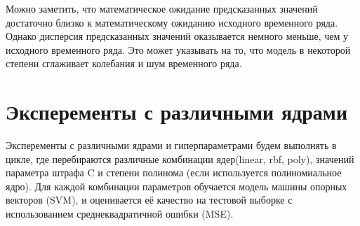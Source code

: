 \documentclass{article}
\begin{document}
Можно заметить, что математическое ожидание предсказанных значений достаточно близко к математическому ожиданию исходного временного ряда. Однако дисперсия предсказанных значений оказывается немного меньше, чем у исходного временного ряда. Это может указывать на то, что модель в некоторой степени сглаживает колебания и шум временного ряда.

\section{Эксперементы с различными ядрами}

Эксперементы с различными ядрами и гиперпараметрами будем выполнять в цикле, где перебираются различные комбинации ядер(linear, rbf, poly), значений параметра штрафа C и степени полинома (если используется полиномиальное ядро). Для каждой комбинации параметров обучается модель машины опорных векторов (SVM), и оценивается её качество на тестовой выборке с использованием среднеквадратичной ошибки (MSE).
\end{document}
